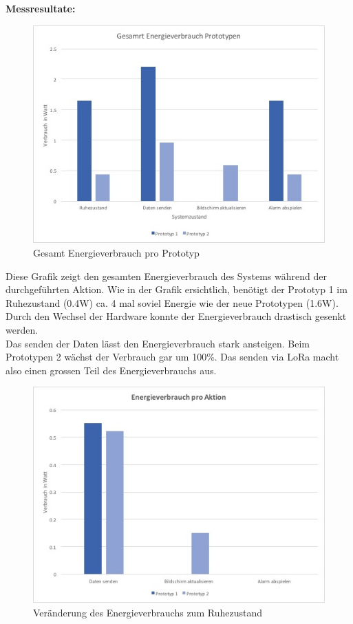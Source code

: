 \documentclass[11pt,english,german]{report}
\theoremstyle{definition}
\begin{document}
\newpage
\noindent
\textbf{Messresultate:}
\begin{figure}[H]
	\centering
	\includegraphics[width=\textwidth]{img/testing/energy_usage.jpg}
	\caption[Gesamt Energieverbrauch pro Prototyp]
	{Gesamt Energieverbrauch pro Prototyp}
\end{figure}
\noindent
Diese Grafik zeigt den gesamten Energieverbrauch des Systems während der durchgeführten Aktion.
Wie in der Grafik ersichtlich, benötigt der Prototyp 1 im Ruhezustand (0.4W) ca. 4 mal soviel Energie wie der neue Prototypen (1.6W). Durch den Wechsel der Hardware konnte der Energieverbrauch drastisch gesenkt werden.\\[0.3cm]
Das senden der Daten lässt den Energieverbrauch stark ansteigen. Beim Prototypen 2 wächst der Verbrauch gar um 100\%. Das senden via LoRa macht also einen grossen Teil des Energieverbrauchs aus.
\newpage
\begin{figure}[H]
\centering
\includegraphics[width=\textwidth]{img/testing/energy_usage_perAction.jpg}
\caption[Veränderung des Energieverbrauchs zum Ruhezustand]
{Veränderung des Energieverbrauchs zum Ruhezustand}
\end{figure}
\end{document}
